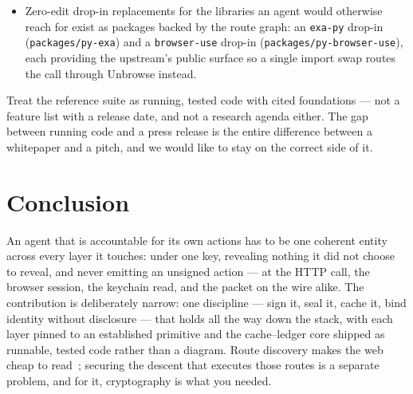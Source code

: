 \documentclass[11pt]{article}
\begin{document}
\begin{itemize}[leftmargin=1.4em]
inverse client/OS harness as a capability-gated, content-addressed pipe
(\texttt{pipes/pipe\_contract.py}). The companion Aiko engine mirrors this boundary:
the server owns recursive contract compilation, the CLI is the bridge, and the
client sees only holes, approvals, and typed pointers rather than graph-control
verbs. The
on-chain deployment of the checkpoint root, the ERC-8004 registry binding, and a
real signed OS/kernel/packet descent across platforms remain integration work,
honestly labelled. The same honesty applies to the end state this embedded substrate
points at --- a site that is a thin reader of on-chain public state, carrying pointers
and sealed payloads only while the closed reverse-engineering compute stays off-chain
--- which is planned but is not yet the live serving path, and is therefore reported as
a frontier, not a feature.
\item Zero-edit drop-in replacements for the libraries an agent would
otherwise reach for exist as packages backed by the route graph: an \texttt{exa-py}
drop-in (\texttt{packages/py-exa}) and a \texttt{browser-use} drop-in
(\texttt{packages/py-browser-use}), each providing the upstream's public surface so a
single import swap routes the call through Unbrowse instead.
\end{itemize}
Treat the reference suite as running, tested code with cited foundations --- not a
feature list with a release date, and not a research agenda either. The gap between
running code and a press release is the entire difference between a whitepaper and a
pitch, and we would like to stay on the correct side of it.

\section{Conclusion}

An agent that is accountable for its own actions has to be one coherent entity
across every layer it touches: under one key, revealing nothing it did not choose to
reveal, and never emitting an unsigned action --- at the HTTP call, the browser
session, the keychain read, and the packet on the wire alike. The contribution is
deliberately narrow: one discipline --- sign it, seal it, cache it, bind identity
without disclosure --- that holds all the way down the stack, with each layer pinned
to an established primitive and the cache--ledger core shipped as runnable, tested
code rather than a diagram. Route discovery makes the web cheap to read~\cite{wedge};
securing the descent that executes those routes is a separate problem, and for it,
cryptography is what you needed.
\end{document}
